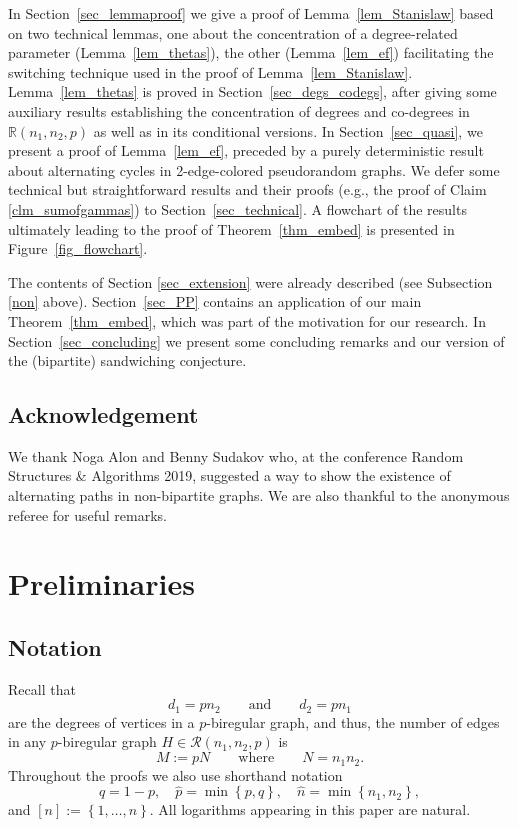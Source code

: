 \documentclass[12pt,reqno]{amsart}
\newcommand{\rc}{{\mathcal{R}}}
\newcommand{\rcnnp}{\rc(n_1,n_2,p)}
\newcommand{\R} {\mathbb R}
\newcommand{\Rnnp}{\R(n_1,n_2,p)}
\theoremstyle{definition}
\begin{document}
 In Section~\ref{sec_lemmaproof} we  give a proof of Lemma~\ref{lem_Stanislaw} based on two technical lemmas, one about the concentration of a degree-related parameter (Lemma~\ref{lem_thetas}), the other (Lemma~\ref{lem_ef}) facilitating the switching technique used in the proof of Lemma~\ref{lem_Stanislaw}. Lemma~\ref{lem_thetas} is proved in Section~\ref{sec_degs_codegs}, after giving some auxiliary results establishing the concentration of degrees and co-degrees in $\Rnnp$ as well as in its conditional versions.  In Section~\ref{sec_quasi}, we present a proof of Lemma~\ref{lem_ef}, preceded by a purely deterministic result about alternating cycles in 2-edge-colored pseudorandom graphs.
 We defer some technical but straightforward results and their proofs (e.g., the proof of Claim \ref{clm_sumofgammas}) to Section~\ref{sec_technical}.
 A flowchart of the results ultimately leading to the proof of Theorem~\ref{thm_embed} is presented in Figure~\ref{fig_flowchart}.

	The contents of Section \ref{sec_extension} were already described (see Subsection \ref{non} above).  Section~\ref{sec_PP} contains an application of our main Theorem~\ref{thm_embed}, which was part of the motivation for our research.
In Section~\ref{sec_concluding} we present some concluding remarks and our version of the (bipartite) sandwiching conjecture.

\subsection{Acknowledgement}
 We thank Noga Alon and Benny Sudakov who, at the conference Random Structures \& Algorithms 2019, suggested a way to show the existence of alternating paths in non-bipartite graphs. We are also thankful to the anonymous referee for useful remarks.

\section{Preliminaries}
\label{sec_tools}

\subsection{Notation}
Recall that
\[
	d_1 = pn_2\qquad\text{and}\qquad d_2 = pn_1
\]
are the degrees of vertices in a $p$-biregular graph, and thus, the number of edges in any $p$-biregular graph $H \in \rcnnp$ is
\[
	M:=pN\qquad\text{where}\qquad N=n_1n_2.
\]
Throughout the proofs we also use shorthand notation
\begin{equation}
  \label{eq_not}
	q = 1 - p, \quad \hat p = \min \left\{ p, q \right\}, \quad \hat n = \min \left\{ n_1,n_2 \right\},
\end{equation}
and $[n] := \left\{ 1, \dots, n \right\}$. All logarithms appearing in this paper are natural.
\end{document}
